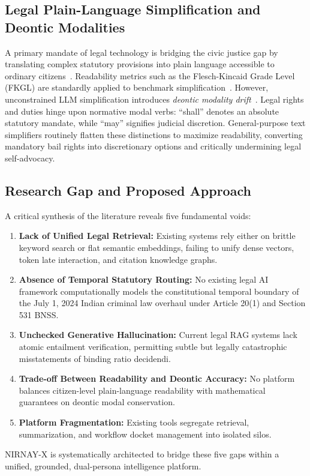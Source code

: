 \documentclass[conference]{IEEEtran}
\begin{document}
\subsection{Legal Plain-Language Simplification and Deontic Modalities}
A primary mandate of legal technology is bridging the civic justice gap by translating complex statutory provisions into plain language accessible to ordinary citizens~\cite{kim2013legal}. Readability metrics such as the Flesch-Kincaid Grade Level (FKGL) are standardly applied to benchmark simplification~\cite{kincaid1975derivation}. However, unconstrained LLM simplification introduces \textit{deontic modality drift}~\cite{von1951deontic}. Legal rights and duties hinge upon normative modal verbs: ``shall'' denotes an absolute statutory mandate, while ``may'' signifies judicial discretion. General-purpose text simplifiers routinely flatten these distinctions to maximize readability, converting mandatory bail rights into discretionary options and critically undermining legal self-advocacy.

\subsection{Research Gap and Proposed Approach}
A critical synthesis of the literature reveals five fundamental voids:
\begin{enumerate}
    \item \textbf{Lack of Unified Legal Retrieval:} Existing systems rely either on brittle keyword search or flat semantic embeddings, failing to unify dense vectors, token late interaction, and citation knowledge graphs.
    \item \textbf{Absence of Temporal Statutory Routing:} No existing legal AI framework computationally models the constitutional temporal boundary of the July 1, 2024 Indian criminal law overhaul under Article 20(1) and Section 531 BNSS.
    \item \textbf{Unchecked Generative Hallucination:} Current legal RAG systems lack atomic entailment verification, permitting subtle but legally catastrophic misstatements of binding ratio decidendi.
    \item \textbf{Trade-off Between Readability and Deontic Accuracy:} No platform balances citizen-level plain-language readability with mathematical guarantees on deontic modal conservation.
    \item \textbf{Platform Fragmentation:} Existing tools segregate retrieval, summarization, and workflow docket management into isolated silos.
\end{enumerate}
NIRNAY-X is systematically architected to bridge these five gaps within a unified, grounded, dual-persona intelligence platform.
\end{document}
